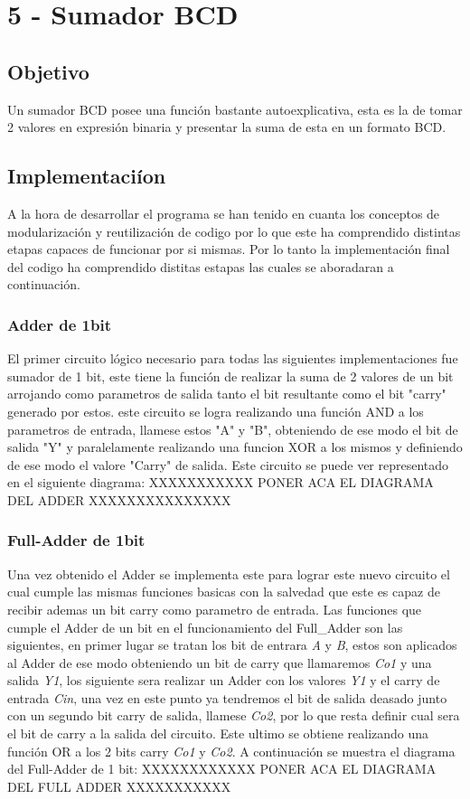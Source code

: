 \chapter*{5 - Sumador BCD}
\section{Objetivo}
  Un sumador BCD posee una funci\'on bastante autoexplicativa, esta es la de tomar 2 valores en expresi\'on binaria y presentar la suma de esta en un formato BCD.
  \section{Implementaci\'ion}
  A la hora de desarrollar el programa se han tenido en cuanta los conceptos de modularizaci\'on y reutilizaci\'on de codigo por lo que este ha comprendido distintas etapas capaces de funcionar por si mismas. Por lo tanto la implementaci\'on final del codigo ha comprendido distitas estapas las cuales se aboradaran a continuaci\'on.
  \subsection{Adder de 1bit}
  El primer circuito l\'ogico necesario para todas las siguientes implementaciones fue sumador de 1 bit, este tiene la funci\'on de realizar la suma de 2 valores de un bit arrojando como parametros de salida tanto el bit resultante como el bit "carry" generado por estos. este circuito se logra realizando una funci\'on AND a los parametros de entrada, llamese estos "A" y "B", obteniendo de ese modo el bit de salida "Y" y paralelamente realizando una funcion XOR a los mismos y definiendo de ese modo el valore "Carry" de salida. Este circuito se puede ver representado en el siguiente diagrama:
  XXXXXXXXXXX PONER ACA EL DIAGRAMA DEL ADDER XXXXXXXXXXXXXXX
  \subsection{Full-Adder de 1bit}
 Una vez obtenido el Adder se implementa este para lograr este nuevo circuito el cual cumple las mismas funciones basicas con la salvedad que este es capaz de recibir ademas un bit carry como parametro de entrada. Las funciones que cumple el Adder de un bit en el funcionamiento del Full_Adder son las siguientes, en primer lugar se tratan los bit de entrara \textit{A} y \textit{B}, estos son aplicados al Adder de ese modo obteniendo un bit de carry que llamaremos \textit{Co1} y una salida \textit{Y1}, los siguiente sera realizar un Adder con los valores \textit{Y1} y el carry de entrada \textit{Cin}, una vez en este punto ya tendremos el bit de salida deasado junto con un segundo bit carry de salida, llamese \textit{Co2}, por lo que resta definir cual sera el bit de carry a la salida del circuito. Este ultimo se obtiene realizando una funci\'on OR a los 2 bits carry \textit{Co1} y \textit{Co2}. A continuación se muestra el diagrama del Full-Adder de 1 bit:
  XXXXXXXXXXXX PONER ACA EL DIAGRAMA DEL FULL ADDER XXXXXXXXXXX
